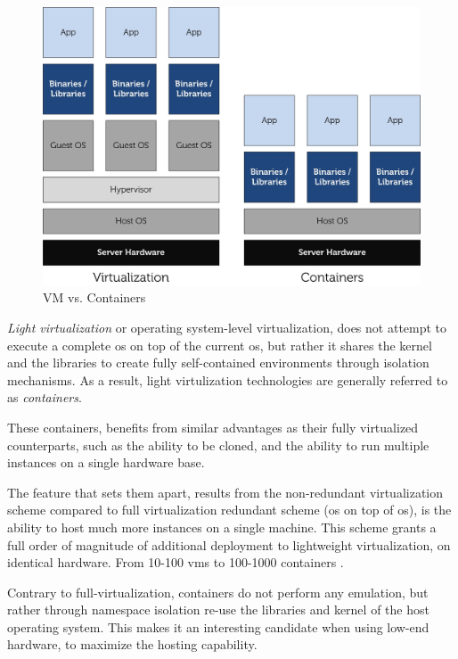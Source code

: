 \documentclass[12pt, titlepage]{uo_temp}
\begin{document}
     \begin{figure}[h]
       \centering
       \includegraphics[width=125mm]{images/lxc_vm.jpg}
       \caption{VM vs. Containers\label{vm_containers} \cite{dell}}
     \end{figure}
     
     \emph{Light virtualization} or operating system-level virtualization, does not
     attempt to execute a complete \gls{os} on top of the current \gls{os}, but rather it
     shares the kernel and the libraries to create fully self-contained environments
     through isolation mechanisms. As a result, light virtulization technologies are
     generally referred to as \emph{containers}.
           
     These containers, benefits from similar advantages as their fully virtualized
     counterparts, such as the ability to be cloned, and the ability to run multiple
     instances on a single hardware base. 
     
     The feature that sets them apart, results from the non-redundant virtualization
     scheme compared to full virtualization redundant scheme (\gls{os} on top of
     \gls{os}), is the ability to host much more instances on a single machine. This
     scheme grants a full order of magnitude of additional deployment to lightweight
     virtualization, on identical hardware. From 10-100 \gls{vm}s to 100-1000 containers
     \cite{dell}.

     Contrary to full-virtualization, containers do not perform any
     emulation, but rather through namespace isolation re-use the libraries and kernel of
     the host operating system. This makes it an interesting candidate when using low-end
     hardware, to maximize the hosting capability. 
     
\end{document}

